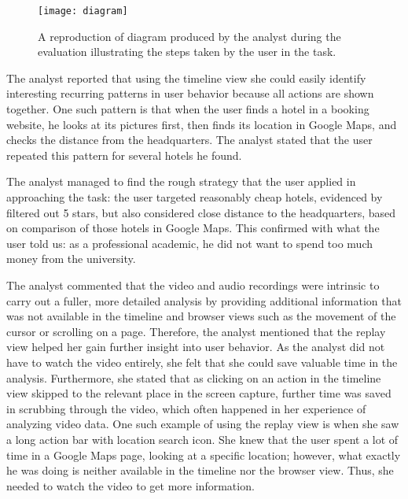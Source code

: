 \begin{figure}[ht]
\centering
\texttt{[image: diagram]}
\caption{A reproduction of diagram produced by the analyst during the evaluation illustrating the steps taken by the user in the task.}
\label{fig:evaluation-diagram}
\end{figure}

The analyst reported that using the timeline view she could easily identify interesting recurring patterns in user behavior because all actions are shown together. One such pattern is that when the user finds a hotel in a booking website, he looks at its pictures first, then finds its location in Google Maps, and checks the distance from the headquarters. The analyst stated that the user repeated this pattern for several hotels he found.

The analyst managed to find the rough strategy that the user applied in approaching the task: the user targeted reasonably cheap hotels, evidenced by filtered out 5 stars, but also considered close distance to the headquarters, based on comparison of those hotels in Google Maps. This confirmed with what the user told us: as a professional academic, he did not want to spend too much money from the university.

The analyst commented that the video and audio recordings were intrinsic to carry out a fuller, more detailed analysis by providing additional information that was not available in the timeline and browser views such as the movement of the cursor or scrolling on a page. Therefore, the analyst mentioned that the replay view helped her gain further insight into user behavior. As the analyst did not have to watch the video entirely, she felt that she could save valuable time in the analysis. Furthermore, she stated that as clicking on an action in the timeline view skipped to the relevant place in the screen capture, further time was saved in scrubbing through the video, which often happened in her experience of analyzing video data. One such example of using the replay view is when she saw a long action bar with location search icon. She knew that the user spent a lot of time in a Google Maps page, looking at a specific location; however, what exactly he was doing is neither available in the timeline nor the browser view. Thus, she needed to watch the video to get more information.

